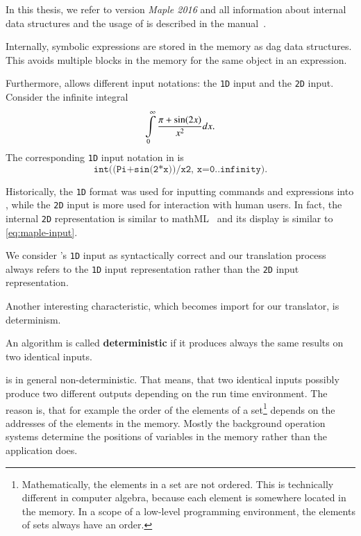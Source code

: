 In this thesis, we refer to version \textit{Maple 2016} and all information about internal data structures and the usage of \Maple{} is described in the manual~\cite{MAPLE:ProgrammingGuide}.

Internally, symbolic expressions are stored in the memory as \gls{dag} data structures. This avoids multiple blocks in the memory for the same object in an expression. 

Furthermore, \Maple{} allows different input notations: the \texttt{1D} input and the \texttt{2D} input. Consider the infinite integral
\begin{equation}\label{eq:maple-input}
\int\displaylimits_0^\infty \frac{\pi+\sin(2x)}{x^2} dx.
\end{equation}
The corresponding \texttt{1D} input notation in \Maple{} is
\begin{equation}\label{eq:1dmaple-input}
\texttt{int((Pi+sin(2*x))/x\^{}2, x=0..infinity)}.
\end{equation}

Historically, the \texttt{1D} format was used for inputting commands and expressions into \Maple, while the \texttt{2D} input is more used for interaction with human users. In fact, the internal \texttt{2D} representation is similar to \gls{mathML}~\cite{MathML} and its display is similar to \eqref{eq:maple-input}.

We consider \Maple's \texttt{1D} input as syntactically correct and our translation process always refers to the \texttt{1D} input representation rather than the \texttt{2D} input representation.

Another interesting characteristic, which becomes import for our translator, is determinism.

\begin{definition}
An algorithm is called \textbf{deterministic} if it produces always the same results on two identical inputs.
\end{definition}

\Maple{} is in general non-deterministic. That means, that two identical inputs possibly produce two different outputs depending on the run time environment. The reason is, that for example the order of the elements of a set\footnote{Mathematically, the elements in a set are not ordered. This is technically different in computer algebra, because each element is somewhere located in the memory. In a scope of a low-level programming environment, the elements of sets always have an order.} depends on the addresses of the elements in the memory. Mostly the background operation systems determine the positions of variables in the memory rather than the application \Maple{} does. 

